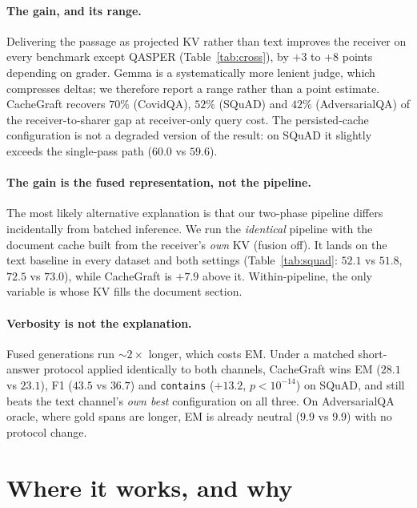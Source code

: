 \documentclass[sigconf,anonymous,review]{acmart}
\newcommand{\sys}{CacheGraft}
\begin{document}
\paragraph{The gain, and its range.} Delivering the passage as projected KV rather than text
improves the receiver on every benchmark except QASPER (Table~\ref{tab:cross}), by $+3$ to $+8$
points depending on grader. Gemma is a systematically more lenient judge, which compresses
deltas; we therefore report a range rather than a point estimate. \sys{} recovers $70\%$
(CovidQA), $52\%$ (SQuAD) and $42\%$ (AdversarialQA) of the receiver-to-sharer gap at
receiver-only query cost. The persisted-cache configuration is not a degraded version of the
result: on SQuAD it slightly exceeds the single-pass path ($60.0$ vs $59.6$).

\paragraph{The gain is the fused representation, not the pipeline.} The most likely alternative
explanation is that our two-phase pipeline differs incidentally from batched inference. We run
the \emph{identical} pipeline with the document cache built from the receiver's \emph{own} KV
(fusion off). It lands on the text baseline in every dataset and both settings
(Table~\ref{tab:squad}: $52.1$ vs $51.8$, $72.5$ vs $73.0$), while \sys{} is $+7.9$ above it.
Within-pipeline, the only variable is whose KV fills the document section.

\paragraph{Verbosity is not the explanation.} Fused generations run ${\sim}2\times$ longer, which
costs EM. Under a matched short-answer protocol applied identically to both channels, \sys{} wins
EM ($28.1$ vs $23.1$), F1 ($43.5$ vs $36.7$) and \texttt{contains} ($+13.2$, $p{<}10^{-14}$) on
SQuAD, and still beats the text channel's \emph{own best} configuration on all three. On
AdversarialQA oracle, where gold spans are longer, EM is already neutral ($9.9$ vs $9.9$) with no
protocol change.

\section{Where it works, and why}
\label{sec:scope}
\end{document}
